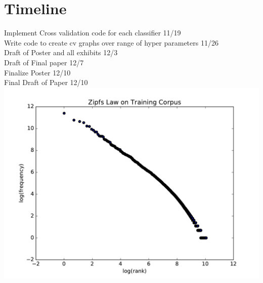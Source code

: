\documentclass[a4paper, 11pt]{article}
\begin{document}
\section{Timeline}
Implement Cross validation code for each classifier 11/19\\
Write code to create cv graphs over range of hyper parameters 11/26\\
Draft of Poster and all exhibits 12/3\\
Draft of Final paper 12/7\\
Finalize Poster 12/10\\
Final Draft of Paper 12/10\\
\includegraphics[scale=.5]{zipfslaw.pdf}
\end{document}
